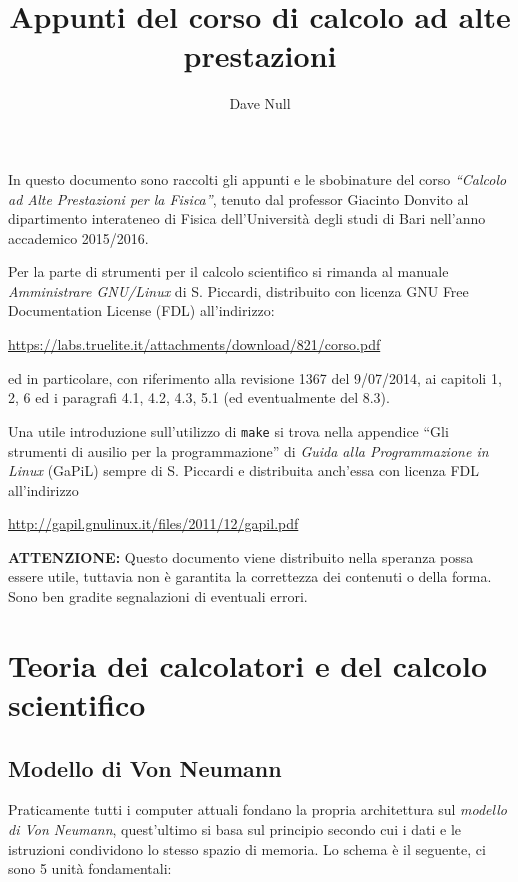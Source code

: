 \documentclass[italian,]{article}
\title{Appunti del corso di calcolo ad alte prestazioni}
\author{Dave Null}
\date{}
\begin{document}
\maketitle

{
\setcounter{tocdepth}{3}
\tableofcontents
}
\newpage

In questo documento sono raccolti gli appunti e le sbobinature del corso
\emph{``Calcolo ad Alte Prestazioni per la Fisica''}, tenuto dal
professor Giacinto Donvito al dipartimento interateneo di Fisica
dell'Università degli studi di Bari nell'anno accademico 2015/2016.

Per la parte di strumenti per il calcolo scientifico si rimanda al
manuale \emph{Amministrare GNU/Linux} di S. Piccardi, distribuito con
licenza GNU Free Documentation License (FDL) all'indirizzo:

\url{https://labs.truelite.it/attachments/download/821/corso.pdf}

ed in particolare, con riferimento alla revisione 1367 del 9/07/2014, ai
capitoli 1, 2, 6 ed i paragrafi 4.1, 4.2, 4.3, 5.1 (ed eventualmente del
8.3).

Una utile introduzione sull'utilizzo di \texttt{make} si trova nella
appendice ``Gli strumenti di ausilio per la programmazione'' di
\emph{Guida alla Programmazione in Linux} (GaPiL) sempre di S. Piccardi
e distribuita anch'essa con licenza FDL all'indirizzo

\url{http://gapil.gnulinux.it/files/2011/12/gapil.pdf}

\textbf{ATTENZIONE:} Questo documento viene distribuito nella speranza
possa essere utile, tuttavia non è garantita la correttezza dei
contenuti o della forma. Sono ben gradite segnalazioni di eventuali
errori.

\newpage

\section{Teoria dei calcolatori e del calcolo
scientifico}\label{teoria-dei-calcolatori-e-del-calcolo-scientifico}

\subsection{Modello di Von Neumann}\label{modello-di-von-neumann}

Praticamente tutti i computer attuali fondano la propria architettura
sul \emph{modello di Von Neumann}, quest'ultimo si basa sul principio
secondo cui i dati e le istruzioni condividono lo stesso spazio di
memoria. Lo schema è il seguente, ci sono 5 unità fondamentali:
\end{document}
